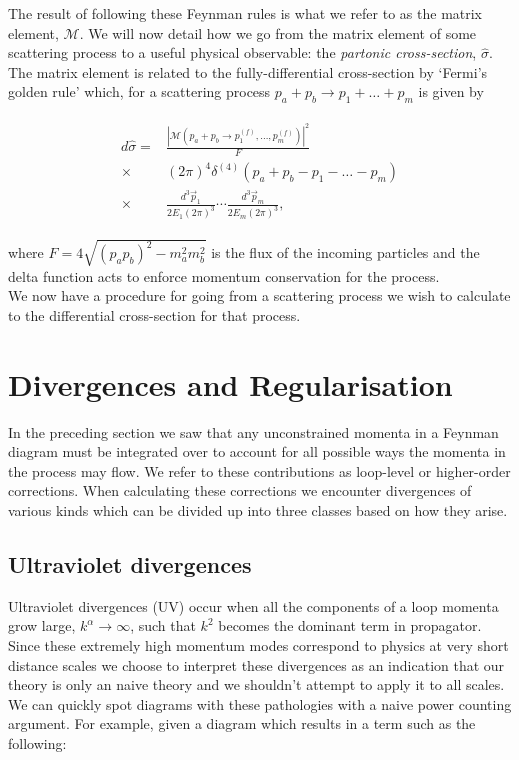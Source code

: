 	The result of following these Feynman rules is what we refer to as the matrix element, $\mathcal{M}$.  We will now detail how
	we go from the matrix element of some scattering process to a useful physical observable: the \emph{partonic cross-section},
	$\hat{\sigma}$.  The matrix element is related to the fully-differential cross-section by `Fermi's golden rule' which, for
	a scattering process $p_{a} + p_{b}\rightarrow p_{1} + \ldots + p_{m}$ is given by

	\begin{align}
	\begin{split}
		d\hat{\sigma} = &\frac{|\mathcal{M}(p_{a} + p_{b}\rightarrow p_{1}^{(f)}, \ldots, p_{m}^{(f)})|^2}{F}\\
		\times&(2\pi)^4\delta^{(4)}(p_{a} + p_{b} - p_{1} - \ldots - p_{m}) \\
		\times&\frac{d^3\vec{p}_1}{2E_1(2\pi)^3}\cdots\frac{d^3\vec{p}_m}{2E_m(2\pi)^3},
	\end{split}
	\end{align}

	where $F=4\sqrt{(p_ap_b)^2 - m_a^2m_b^2}$ is the flux of the incoming particles and the delta function acts to
	enforce momentum conservation for the process.\\We now have a procedure for going from a scattering process
	we wish to calculate to the differential cross-section for that process.

\section{Divergences and Regularisation}
	\label{sec:divAndReg}

	In the preceding section we saw that any unconstrained momenta in a Feynman diagram must be integrated over to account
	for all possible ways the momenta in the process may flow.  We refer to these contributions as loop-level or
	higher-order corrections.  When calculating these corrections we encounter divergences of various kinds which can be
	divided up into three classes based on how they arise.

	\subsection{Ultraviolet divergences}

		Ultraviolet divergences (UV) occur when all the components of a loop momenta grow large,
		$k^\alpha\rightarrow\infty$, such that $k^2$ becomes the dominant term in propagator.
		Since these extremely high momentum modes correspond to physics at very short distance scales
		we choose to interpret these divergences as an indication that our theory is only an naive
		theory and we shouldn't attempt to apply it to all scales.  We can quickly spot diagrams with these
		pathologies with a naive power counting argument.  For example, given a diagram which results in a
		term such as the following:

